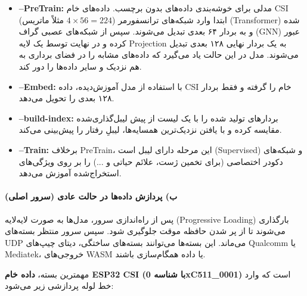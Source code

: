 \documentclass[12pt, a4paper]{article}
\newcommand{\lr}[1]{\foreignlanguage{english}{#1}}
\begin{document}
\begin{itemize}
    \item \textbf{\lr{--PreTrain}:} مدلی برای خوشه‌بندی داده‌های بدون برچسب. داده‌های خام \lr{CSI} (مثلاً ماتریس $4 \times 56 = 224$) ابتدا وارد شبکه‌های ترانسفورمر (\lr{Transformer}) شده و به بردار ۶۴ بعدی تبدیل می‌شوند. سپس از شبکه‌های عصبی گراف (\lr{GNN}) عبور کرده و در نهایت توسط یک لایه \lr{Projection} به یک بردار نهایی ۱۲۸ بعدی تبدیل می‌شوند. مدل در این حالت یاد می‌گیرد که داده‌های مشابه را در فضای برداری به هم نزدیک و سایر داده‌ها را دور کند.
    \item \textbf{\lr{--Embed}:} با استفاده از مدل آموزش‌دیده، داده \lr{CSI} خام را گرفته و فقط بردار ۱۲۸ بعدی را تحویل می‌دهد.
    \item \textbf{\lr{--build-index}:} بردارهای تولید شده را با یک لیست از پیش لیبل‌گذاری‌شده مقایسه کرده و با یافتن نزدیک‌ترین همسایه‌ها، لیبلِ رفتار را پیش‌بینی می‌کند.
    \item \textbf{\lr{--Train}:} برخلاف \lr{PreTrain}، این مرحله دارای لیبل است (\lr{Supervised}) و شبکه‌های دکودر اختصاصی (برای تخمین ژست، علائم حیاتی و ...) را بر روی ویژگی‌های استخراج‌شده آموزش می‌دهد.
\end{itemize}

\paragraph{ب) پردازش داده‌ها در حالت عادی (سرور اصلی)}
پس از راه‌اندازی سرور، مدل‌ها به صورت لایه‌لایه (\lr{Progressive Loading}) بارگذاری می‌شوند تا از پر شدن حافظه موقت جلوگیری شود. سپس سرور منتظر بسته‌های \lr{UDP} می‌ماند. این بسته‌ها می‌توانند بسته‌های ساختگی، دیتای چیپ‌های \lr{Qualcomm} یا \lr{Mediatek}، خروجی‌های \lr{WASM} یا داده همگام‌سازی باشند.

مهمترین بسته، \textbf{داده خام \lr{ESP32 CSI} (با شناسه \lr{0xC511\_0001})} است که وارد خط لوله پردازشی زیر می‌شود:
\end{document}
